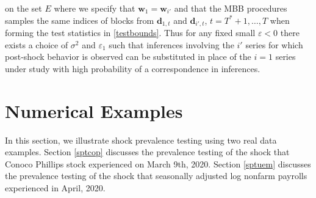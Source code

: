\documentclass[11pt]{article}
\newcommand{\dbf}{\textbf{d}}
\theoremstyle{definition}
\begin{document}
on the set $E$ where we specify that $\textbf{w}_1 = \textbf{w}_{i'}$ and that the MBB procedures samples the same indices of blocks from $\dbf_{1,t}$ and $\dbf_{i',t}$, $t = T^*+1,\ldots, T$ when forming the test statistics in \eqref{testbounds}. Thus for any fixed small $\varepsilon < 0$ there exists a choice of $\sigma^2$ and $\varepsilon_1$ such that inferences involving the $i'$ series for which post-shock behavior is observed can be substituted in place of the $i = 1$ series under study with high probability of a correspondence in inferences. 














\section{Numerical Examples}

\label{sec::ne}

In this section, we illustrate shock prevalence testing using two real data examples. Section \ref{sptcop} discusses the prevalence testing of the shock that Conoco Phillips stock experienced on March 9th, 2020. Section \ref{sptuem} discusses the prevalence testing of the shock that seasonally adjusted log nonfarm payrolls experienced in April, 2020. 
\end{document}
